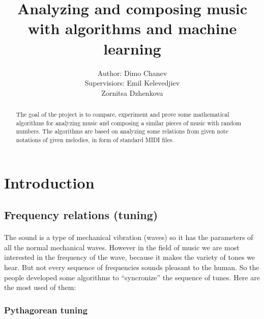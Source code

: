 \documentclass[]{article}
\title{Analyzing and composing music with algorithms and machine learning}
\author{
    \begin{tabular}{rl}
        \normalsize{Author: } & \normalsize{Dimo Chanev} \\
        \scriptsize{Supervisiors: } & \scriptsize{Emil Kelevedjiev}\\
                                    & \scriptsize{Zornitsa Dzhenkova}
    \end{tabular}
}
\begin{document}
    \maketitle
    \newpage

    \tableofcontents

    \newpage
    \begin{abstract}
        The goal of the project is to compare, experiment and prove some mathematical algorithms for analyzing music and composing a similar pieces of music with random numbers. The algorithms are based on analyzing some relations from given note notations of given melodies, in form of standard MIDI files.
    \end{abstract}

    \newpage

    \section{Introduction}
        \subsection {Frequency relations (tuning)}
        \paragraph{} The sound is a type of mechanical vibration (waves) so it has the parameters of all the normal mechanical waves. However in the field of music we are most interested in the frequency of the wave, because it makes the variety of tones we hear. But not every sequence of frequencies sounds pleasant to the human. So the people developed some algorithms to ``syncronize'' the sequence of tunes. Here are the most used of them:

            \subsubsection {Pythagorean tuning} 
\end{document}
